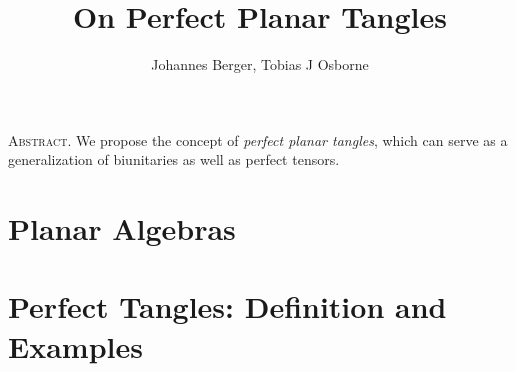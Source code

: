 \documentclass[11pt,a4paper,twoside]{article}
\author{Johannes Berger, Tobias J Osborne}
\title{On Perfect Planar Tangles}
\date{}
\begin{document}
\pagestyle{headings}
\maketitle
\begin{center}
	\begin{minipage}{0.8\textwidth}
		\textsc{Abstract.} We propose the concept of \emph{perfect planar tangles}, which can serve as a generalization of biunitaries as well as perfect tensors.
	\end{minipage}
\end{center}


%	

\section{Planar Algebras}
	

\section{Perfect Tangles: Definition and Examples}
	



\nocite{*}
%
\end{document}
